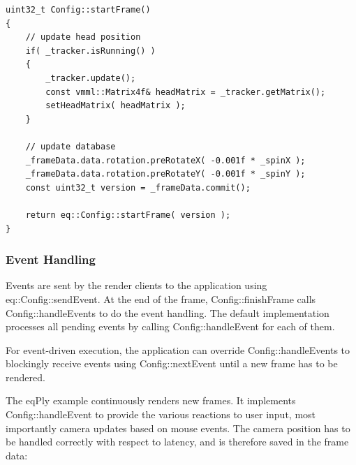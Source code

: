 \documentclass[10pt,a4]{scrartcl}
\begin{document}
{\footnotesize\begin{lstlisting}
uint32_t Config::startFrame()
{
    // update head position
    if( _tracker.isRunning() )
    {
        _tracker.update();
        const vmml::Matrix4f& headMatrix = _tracker.getMatrix();
        setHeadMatrix( headMatrix );
    }

    // update database
    _frameData.data.rotation.preRotateX( -0.001f * _spinX );
    _frameData.data.rotation.preRotateY( -0.001f * _spinY );
    const uint32_t version = _frameData.commit();

    return eq::Config::startFrame( version );
}
\end{lstlisting}}


\subsubsection{Event Handling}

Events are sent by the render clients to the application using
\textsf{eq::Config::sendEvent}. At the end of the frame,
\textsf{Config::finishFrame} calls \textsf{Config::handleEvents} to do
the event handling. The default implementation processes all pending
events by calling \textsf{Config::handleEvent} for each of them.

For event-driven execution, the application can override
\textsf{Config::handleEvents} to blockingly receive events using
\textsf{Config::nextEvent} until a new frame has to be rendered.

The \textsf{eqPly} example continuously renders new frames. It
implements \textsf{Config::hand\-le\-Event} to provide the various reactions
to user input, most importantly camera updates based on mouse
events. The camera position has to be handled correctly with respect to
latency, and is therefore saved in the frame data:
\end{document}
